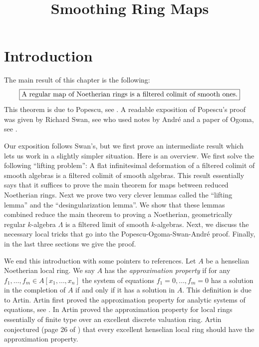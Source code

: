 

%


\title{Smoothing Ring Maps}


\maketitle

\label{section-phantom}

\tableofcontents

\section{Introduction}
\label{section-introduction}

\noindent
The main result of this chapter is the following:
$$
\fbox{A regular map of Noetherian rings is a filtered colimit
of smooth ones.}
$$
This theorem is due to Popescu, see \cite{popescu-letter}.
A readable exposition of Popescu's proof was given by Richard Swan,
see \cite{swan} who used notes by Andr\'e and a paper of Ogoma, see
\cite{Ogoma}.

\medskip\noindent
Our exposition follows Swan's, but we first prove an intermediate result
which lets us work in a slightly simpler situation. Here is an overview.
We first solve the following ``lifting problem'': A flat infinitesimal
deformation of a filtered colimit of smooth algebras is a filtered colimit
of smooth algebras. This result essentially says that it suffices to prove
the main theorem for maps between reduced Noetherian rings. Next we prove
two very clever lemmas called the ``lifting lemma'' and the
``desingularization lemma''. We show that these lemmas combined
reduce the main theorem to proving a Noetherian, geometrically regular
$k$-algebra $\Lambda$ is a filtered limit of smooth $k$-algebras.
Next, we discuss the necessary local tricks that go into the
Popescu-Ogoma-Swan-Andr\'e proof. Finally, in the last three sections
we give the proof.

\medskip\noindent
We end this introduction with some pointers to references.
Let $A$ be a henselian Noetherian local ring.
We say $A$ has the {\it approximation property} if for any
$f_1, \ldots, f_m \in A[x_1, \ldots, x_n]$ the system of equations
$f_1 = 0, \ldots, f_m = 0$ has a solution in the completion
of $A$ if and only if it has a solution in $A$. This definition
is due to Artin.
Artin first proved the approximation property for analytic systems of
equations, see \cite{Artin-Analytic-Approximation}.
In \cite{Artin-Algebraic-Approximation} Artin proved the
approximation property for local rings
essentially of finite type over an excellent discrete valuation ring.
Artin conjectured (page 26 of \cite{Artin-Algebraic-Approximation})
that every excellent henselian local ring should have the
approximation property.

